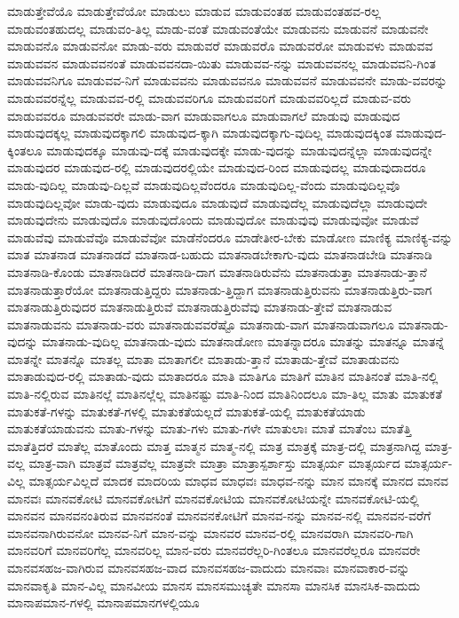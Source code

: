 {ಮಾಡುತ್ತೇವೆಯೊ
ಮಾಡುತ್ತೇವೆಯೋ
ಮಾಡುಲು
ಮಾಡುವ
ಮಾಡುವಂತಹ
ಮಾಡುವಂತಹವ-ರಲ್ಲ
ಮಾಡುವಂತಹುದಲ್ಲ
ಮಾಡುವಂ-ತಿಲ್ಲ
ಮಾಡು-ವಂತೆ
ಮಾಡುವಂತೆಯೇ
ಮಾಡುವನು
ಮಾಡುವನೆ
ಮಾಡುವನೇ
ಮಾಡುವನೊ
ಮಾಡುವನೋ
ಮಾಡು-ವರು
ಮಾಡುವರೆ
ಮಾಡುವರೊ
ಮಾಡುವರೋ
ಮಾಡುವಳು
ಮಾಡುವವ
ಮಾಡುವವನ
ಮಾಡುವವನಂತೆ
ಮಾಡುವವನದಾ-ಯಿತು
ಮಾಡುವವ-ನನ್ನು
ಮಾಡುವವನಲ್ಲ
ಮಾಡುವವನಿ-ಗಿಂತ
ಮಾಡುವವನಿಗೂ
ಮಾಡುವವ-ನಿಗೆ
ಮಾಡುವವನು
ಮಾಡುವವನೂ
ಮಾಡುವವನೆ
ಮಾಡುವವನೇ
ಮಾಡು-ವವರನ್ನು
ಮಾಡುವವರನ್ನೆಲ್ಲ
ಮಾಡುವವ-ರಲ್ಲಿ
ಮಾಡುವವರಿಗೂ
ಮಾಡುವವರಿಗೆ
ಮಾಡುವವರಿಲ್ಲದೆ
ಮಾಡುವ-ವರು
ಮಾಡುವವರೂ
ಮಾಡುವವರೇ
ಮಾಡು-ವಾಗ
ಮಾಡುವಾಗಲೂ
ಮಾಡುವಾಗಲೆ
ಮಾಡುವು
ಮಾಡುವುದ
ಮಾಡುವುದಕ್ಕಲ್ಲ
ಮಾಡುವುದಕ್ಕಾಗಲಿ
ಮಾಡುವುದ-ಕ್ಕಾಗಿ
ಮಾಡುವುದಕ್ಕಾಗು-ವುದಿಲ್ಲ
ಮಾಡುವುದಕ್ಕಿಂತ
ಮಾಡುವುದ-ಕ್ಕಿಂತಲೂ
ಮಾಡುವುದಕ್ಕೂ
ಮಾಡುವು-ದಕ್ಕೆ
ಮಾಡುವುದಕ್ಕೇ
ಮಾಡು-ವುದನ್ನು
ಮಾಡುವುದನ್ನೆಲ್ಲಾ
ಮಾಡುವುದನ್ನೇ
ಮಾಡುವುದರ
ಮಾಡುವುದ-ರಲ್ಲಿ
ಮಾಡುವುದರಲ್ಲಿಯೇ
ಮಾಡುವುದ-ರಿಂದ
ಮಾಡುವುದಲ್ಲ
ಮಾಡುವುದಾದರೂ
ಮಾಡು-ವುದಿಲ್ಲ
ಮಾಡುವು-ದಿಲ್ಲವೆ
ಮಾಡುವುದಿಲ್ಲವೆಂದರೂ
ಮಾಡುವುದಿಲ್ಲ-ವೆಂದು
ಮಾಡುವುದಿಲ್ಲವೊ
ಮಾಡುವುದಿಲ್ಲವೋ
ಮಾಡು-ವುದು
ಮಾಡುವುದೂ
ಮಾಡುವುದೆ
ಮಾಡುವುದೆಲ್ಲ
ಮಾಡುವುದೆಲ್ಲಾ
ಮಾಡುವುದೇ
ಮಾಡುವುದೇನು
ಮಾಡುವುದೊ
ಮಾಡುವುದೊಂದು
ಮಾಡುವುದೋ
ಮಾಡುವುವು
ಮಾಡುವುವೋ
ಮಾಡುವೆ
ಮಾಡುವೆವು
ಮಾಡುವೆವೊ
ಮಾಡುವೆವೋ
ಮಾಡೆನೆಂದರೂ
ಮಾಡೇತೀರ-ಬೇಕು
ಮಾಡೋಣ
ಮಾಣಿಕ್ಯ
ಮಾಣಿಕ್ಯ-ವನ್ನು
ಮಾತ
ಮಾತನಾಡ
ಮಾತನಾಡದೆ
ಮಾತನಾಡ-ಬಹುದು
ಮಾತನಾಡಬೇಕಾಗು-ವುದು
ಮಾತನಾಡಬೇಡಿ
ಮಾತನಾಡಿ
ಮಾತನಾಡಿ-ಕೊಂಡು
ಮಾತನಾಡಿದರೆ
ಮಾತನಾಡಿ-ದಾಗ
ಮಾತನಾಡಿರುವೆನು
ಮಾತನಾಡುತ್ತಾ
ಮಾತನಾಡು-ತ್ತಾನೆ
ಮಾತನಾಡುತ್ತಾರೆಯೋ
ಮಾತನಾಡುತ್ತಿದ್ದರು
ಮಾತನಾಡು-ತ್ತಿದ್ದಾಗ
ಮಾತನಾಡುತ್ತಿರುವನು
ಮಾತನಾಡುತ್ತಿರು-ವಾಗ
ಮಾತನಾಡುತ್ತಿರುವುದರ
ಮಾತನಾಡುತ್ತಿರುವೆ
ಮಾತನಾಡುತ್ತಿರುವೆವು
ಮಾತನಾಡು-ತ್ತೇವೆ
ಮಾತನಾಡುವ
ಮಾತನಾಡುವನು
ಮಾತನಾಡು-ವರು
ಮಾತನಾಡುವವರೆಷ್ಟೊ
ಮಾತನಾಡು-ವಾಗ
ಮಾತನಾಡುವಾಗಲೂ
ಮಾತನಾಡು-ವುದನ್ನು
ಮಾತನಾಡು-ವುದಿಲ್ಲ
ಮಾತನಾಡು-ವುದು
ಮಾತನಾಡೋಣ
ಮಾತನ್ನಾದರೂ
ಮಾತನ್ನು
ಮಾತನ್ನೂ
ಮಾತನ್ನೆ
ಮಾತನ್ನೇ
ಮಾತನ್ನೊ
ಮಾತಲ್ಲ
ಮಾತಾ
ಮಾತಾಗಲೀ
ಮಾತಾಡು-ತ್ತಾನೆ
ಮಾತಾಡು-ತ್ತೇವೆ
ಮಾತಾಡುವನು
ಮಾತಾಡುವುದ-ರಲ್ಲಿ
ಮಾತಾಡು-ವುದು
ಮಾತಾದರೂ
ಮಾತಿ
ಮಾತಿಗೂ
ಮಾತಿಗೆ
ಮಾತಿನ
ಮಾತಿನಂತೆ
ಮಾತಿ-ನಲ್ಲಿ
ಮಾತಿ-ನಲ್ಲಿರುವ
ಮಾತಿನಲ್ಲೆ
ಮಾತಿನಲ್ಲೆಲ್ಲ
ಮಾತಿನಷ್ಟು
ಮಾತಿ-ನಿಂದ
ಮಾತಿನಿಂದಲೂ
ಮಾ-ತಿಲ್ಲ
ಮಾತು
ಮಾತುಕತೆ
ಮಾತುಕತೆ-ಗಳನ್ನು
ಮಾತುಕತೆ-ಗಳಲ್ಲಿ
ಮಾತುಕತೆಯಲ್ಲದೆ
ಮಾತುಕತೆ-ಯಲ್ಲಿ
ಮಾತುಕತೆಯಾಡು
ಮಾತುಕತೆಯಾಡುವನು
ಮಾತು-ಗಳನ್ನು
ಮಾತು-ಗಳು
ಮಾತು-ಗಳೇ
ಮಾತುಲಾಃ
ಮಾತೆ
ಮಾತೆಂಬ
ಮಾತೆತ್ತಿ
ಮಾತೆತ್ತಿದರೆ
ಮಾತೆಲ್ಲ
ಮಾತೊಂದು
ಮಾತ್ತ
ಮಾತ್ಮನ
ಮಾತ್ಮ-ನಲ್ಲಿ
ಮಾತ್ರ
ಮಾತ್ರಕ್ಕೆ
ಮಾತ್ರ-ದಲ್ಲಿ
ಮಾತ್ರನಾಗಿದ್ದ
ಮಾತ್ರ-ವಲ್ಲ
ಮಾತ್ರ-ವಾಗಿ
ಮಾತ್ರವೆ
ಮಾತ್ರವೆಲ್ಲ
ಮಾತ್ರವೇ
ಮಾತ್ರಾ
ಮಾತ್ರಾಸ್ಪರ್ಶಾಸ್ತು
ಮಾತ್ಸರ್ಯ
ಮಾತ್ಸರ್ಯದ
ಮಾತ್ಸರ್ಯ-ವಿಲ್ಲ
ಮಾತ್ಸರ್ಯವಿಲ್ಲದೆ
ಮಾದಕ
ಮಾದರಿಯ
ಮಾಧವ
ಮಾಧವಃ
ಮಾಧವ-ನನ್ನು
ಮಾನ
ಮಾನಕ್ಕೆ
ಮಾನದ
ಮಾನವ
ಮಾನವಃ
ಮಾನವಕೋಟಿ
ಮಾನವಕೋಟಿಗೆ
ಮಾನವಕೋಟಿಯ
ಮಾನವಕೋಟಿಯನ್ನೇ
ಮಾನವಕೋಟಿ-ಯಲ್ಲಿ
ಮಾನವನ
ಮಾನವನಂತಿರುವ
ಮಾನವನಂತೆ
ಮಾನವನಕೋಟಿಗೆ
ಮಾನವ-ನನ್ನು
ಮಾನವ-ನಲ್ಲಿ
ಮಾನವನ-ವರೆಗೆ
ಮಾನವನಾಗಿರುವನೋ
ಮಾನವ-ನಿಗೆ
ಮಾನ-ವನ್ನು
ಮಾನವರ
ಮಾನವ-ರಲ್ಲಿ
ಮಾನವರಾಗಿ
ಮಾನವರಿ-ಗಾಗಿ
ಮಾನವರಿಗೆ
ಮಾನವರಿಗೆಲ್ಲ
ಮಾನವರಿಲ್ಲ
ಮಾನ-ವರು
ಮಾನವರೆಲ್ಲರಿ-ಗಿಂತಲೂ
ಮಾನವರೆಲ್ಲರೂ
ಮಾನವರೇ
ಮಾನವಸಹಜ-ವಾಗಿರುವ
ಮಾನವಸಹಜ-ವಾದ
ಮಾನವಸಹಜ-ವಾದುದು
ಮಾನವಾಃ
ಮಾನವಾಕಾರ-ವನ್ನು
ಮಾನವಾಕೃತಿ
ಮಾನ-ವಿಲ್ಲ
ಮಾನವೀಯ
ಮಾನಸ
ಮಾನಸಮುಚ್ಯತೇ
ಮಾನಸಾ
ಮಾನಸಿಕ
ಮಾನಸಿಕ-ವಾದುದು
ಮಾನಾಪಮಾನ-ಗಳಲ್ಲಿ
ಮಾನಾಪಮಾನಗಳಲ್ಲಿಯೂ
}

